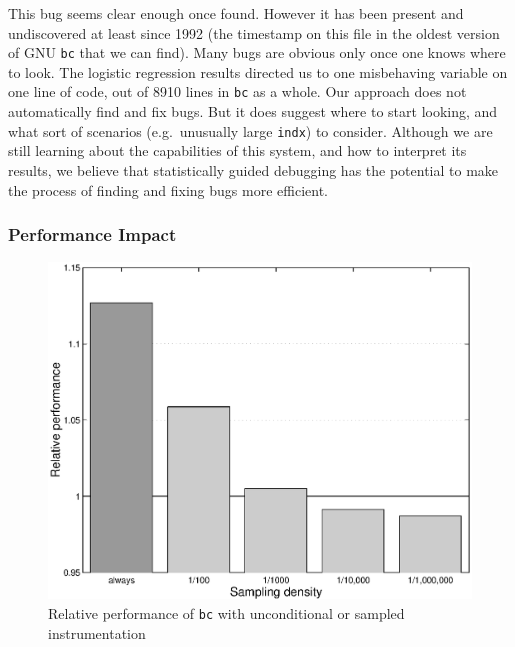 
This bug seems clear enough once found.  However it has been present
and undiscovered at least since 1992 (the time\-stamp on this file in
the oldest version of GNU \texttt{bc} that we can find).  Many bugs
are obvious only once one knows where to look.  The logistic
regression results directed us to one misbehaving variable on one line
of code, out of 8910 lines in \texttt{bc} as a whole.  Our approach
does not automatically find and fix bugs.  But it does suggest where
to start looking, and what sort of scenarios (e.g.\ unusually large
\texttt{indx}) to consider.  Although we are still learning about the
capabilities of this system, and how to interpret its results, we
believe that statistically guided debugging has the potential to make
the process of finding and fixing bugs more efficient.

\subsubsection{Performance Impact}

\begin{figure}
  \centering
  \small
  \includegraphics[width=\columnwidth]{applications/bc_density}
  \caption{Relative performance of \texttt{bc} with unconditional or
    sampled instrumentation}
  \label{fig:bc:slowdown}
\end{figure}

